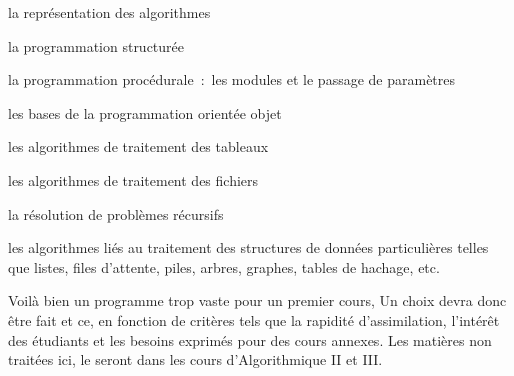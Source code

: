	\begin{liste}
	\item 
		la représentation des algorithmes
	\item
		la programmation structurée
	\item
		la programmation procédurale~:~les modules et 
		le passage de paramètres
	\item
		les bases de la programmation orientée objet
	\item
		les algorithmes de traitement des tableaux
	\item
		les algorithmes de traitement des fichiers
	\item
		la résolution de problèmes récursifs
	\item
		les algorithmes liés au traitement des structures de données particulières telles
		que listes, files d’attente, piles, arbres, graphes, tables de hachage,
		etc.
	\end{liste}

	Voilà bien un programme trop vaste pour un premier cours, 
	Un choix devra donc être fait et ce, en fonction
	de critères tels que la rapidité d’assimilation, l’intérêt des
	étudiants et les besoins exprimés pour des cours annexes. 
	Les matières non traitées ici, 
	le seront dans les cours d'Algorithmique II et III. 

	

